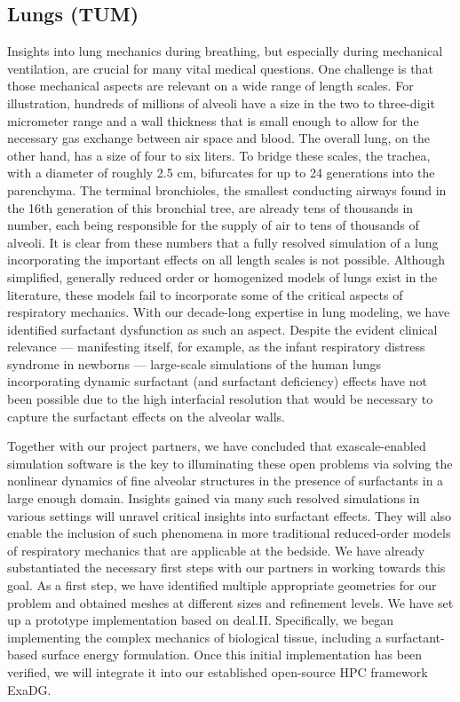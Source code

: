 \documentclass[a4paper,12pt]{article}
\begin{document}
\subsection{Lungs (TUM)}
Insights into lung mechanics during breathing, but especially during mechanical ventilation, are crucial for many vital medical questions.
One challenge is that those mechanical aspects are relevant on a wide range of length scales.
For illustration, hundreds of millions of alveoli have a size in the two to three-digit micrometer range and a wall thickness that is small enough to allow for the necessary gas exchange between air space and blood.
The overall lung, on the other hand, has a size of four to six liters.
To bridge these scales, the trachea, with a diameter of roughly 2.5 cm, bifurcates for up to 24 generations into the parenchyma.
The terminal bronchioles, the smallest conducting airways found in the 16th generation of this bronchial tree, are already tens of thousands in number, each being responsible for the supply of air to tens of thousands of alveoli.
It is clear from these numbers that a fully resolved simulation of a lung incorporating the important effects on all length scales is not possible.
Although simplified, generally reduced order or homogenized models of lungs exist in the literature, these models fail to incorporate some of the critical aspects of respiratory mechanics.
With our decade-long expertise in lung modeling, we have identified surfactant dysfunction as such an aspect.
Despite the evident clinical relevance — manifesting itself, for example, as the infant respiratory distress syndrome in newborns — large-scale simulations of the human lungs incorporating dynamic surfactant (and surfactant deficiency) effects have not been possible due to the high interfacial resolution that would be necessary to capture the surfactant effects on the alveolar walls.

Together with our project partners, we have concluded that exascale-enabled simulation software is the key to illuminating these open problems via solving the nonlinear dynamics of fine alveolar structures in the presence of surfactants in a large enough domain.
Insights gained via many such resolved simulations in various settings will unravel critical insights into surfactant effects.
They will also enable the inclusion of such phenomena in more traditional reduced-order models of respiratory mechanics that are applicable at the bedside.
We have already substantiated the necessary first steps with our partners in working towards this goal.
As a first step, we have identified multiple appropriate geometries for our problem and obtained meshes at different sizes and refinement levels.
We have set up a prototype implementation based on deal.II.
Specifically, we began implementing the complex mechanics of biological tissue, including a surfactant-based surface energy formulation.
Once this initial implementation has been verified, we will integrate it into our established open-source HPC framework ExaDG.
\end{document}
